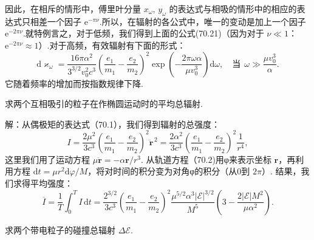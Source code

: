 因此，在相斥的情形中，傅里叶分量 $x_\omega$, $y_\omega$ 的表达式与相吸的情形中的相应的表达式只相差一个因子 $\mathrm{e}^{-\pi\nu}$.所以，在辐射的各公式中，唯一的变动是加上一个因子 $\mathrm{e}^{-2\pi\nu}$.就特例言之，对于低频，我们得到上面的公式(70.21)（因为对于 $\nu\ll 1$：$\mathrm{e}^{-2\pi\nu}\approx 1$）.对于高频，有效辐射有下面的形式：
\begin{equation}
  \mathrm{d}\varkappa_\omega=\frac{16\pi\alpha^2}{3^{3/2}v_0^2c^3}\left(\frac{e_1}{m_1}-\frac{e_2}{m_2}\right)^2
  \exp\left(-\frac{2\pi\omega\alpha}{\mu v_0^3}\right)\mathrm{d}\omega,\quad
  \text{当}\ \ \omega\gg\frac{\mu v_0^3}{\alpha}.
\end{equation}
它随着频率的增加而按指数规律下降.

\begin{xiti}

\quad 求两个互相吸引的粒子在作椭圆运动时的平均总辐射.

解：从偶极矩的表达式（70.1），我们得到辐射的总强度：
\begin{equation*}
  I=\frac{2\mu^2}{3c^3}\left(\frac{e_1}{m_1}-\frac{e_2}{m_2}\right)^2\ddot{\boldsymbol{r}}^{\,2}
  =\frac{2\alpha^2}{3c^3}\left(\frac{e_1}{m_1}-\frac{e_2}{m_2}\right)^2\frac{1}{r^4},
\end{equation*}
这里我们用了运动方程 $\mu\ddot{\boldsymbol{r}}=-\alpha\boldsymbol{r}/r^3$. 从轨道方程（70.2)用φ来表示坐标 $\boldsymbol{r}$，再利用方程 $\mathrm{d}t=\mu r^2\mathrm{d}\varphi/M$，将对时间的积分变为对角φ的积分（从0到 $2\pi$）. 结果，我们求得平均强度：
\begin{equation*}
  \overline{I}=\frac{1}{T}\int_0^T I\,\mathrm{d}t
  =\frac{2^{3/2}}{3c^3}\left(\frac{e_1}{m_1}-\frac{e_2}{m_2}\right)^2
  \frac{\mu^{5/2}\alpha^3|\mathcal{E}|^{3/2}}{M^5}
  \left(3-\frac{2|\mathcal{E}|M^2}{\mu\alpha^2}\right).
\end{equation*}

\quad 求两个带电粒子的碰撞总辐射 $\Delta\mathcal{E}$.


\end{xiti}
